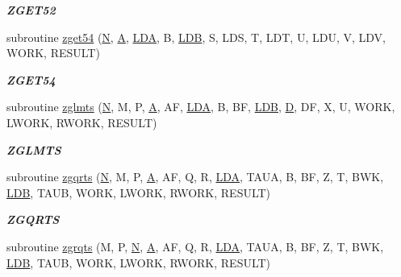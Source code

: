 \begin{DoxyCompactItemize}
\begin{DoxyCompactList}\small\item\em {\bfseries Z\+G\+E\+T52} \end{DoxyCompactList}\item 
subroutine \hyperlink{group__complex16__eig_ga8cfa5d9479fe4546ef7d28e400003358}{zget54} (\hyperlink{polmisc_8c_a0240ac851181b84ac374872dc5434ee4}{N}, \hyperlink{classA}{A}, \hyperlink{example__user_8c_ae946da542ce0db94dced19b2ecefd1aa}{L\+D\+A}, B, \hyperlink{example__user_8c_a50e90a7104df172b5a89a06c47fcca04}{L\+D\+B}, S, L\+D\+S, T, L\+D\+T, U, L\+D\+U, V, L\+D\+V, W\+O\+R\+K, R\+E\+S\+U\+L\+T)
\begin{DoxyCompactList}\small\item\em {\bfseries Z\+G\+E\+T54} \end{DoxyCompactList}\item 
subroutine \hyperlink{group__complex16__eig_gab64718de54eca7f9e28308a0cdce411f}{zglmts} (\hyperlink{polmisc_8c_a0240ac851181b84ac374872dc5434ee4}{N}, M, P, \hyperlink{classA}{A}, A\+F, \hyperlink{example__user_8c_ae946da542ce0db94dced19b2ecefd1aa}{L\+D\+A}, B, B\+F, \hyperlink{example__user_8c_a50e90a7104df172b5a89a06c47fcca04}{L\+D\+B}, \hyperlink{odrpack_8h_a7dae6ea403d00f3687f24a874e67d139}{D}, D\+F, X, U, W\+O\+R\+K, L\+W\+O\+R\+K, R\+W\+O\+R\+K, R\+E\+S\+U\+L\+T)
\begin{DoxyCompactList}\small\item\em {\bfseries Z\+G\+L\+M\+T\+S} \end{DoxyCompactList}\item 
subroutine \hyperlink{group__complex16__eig_ga66843d0b4fb7bdf9641534ed86711b55}{zgqrts} (\hyperlink{polmisc_8c_a0240ac851181b84ac374872dc5434ee4}{N}, M, P, \hyperlink{classA}{A}, A\+F, Q, R, \hyperlink{example__user_8c_ae946da542ce0db94dced19b2ecefd1aa}{L\+D\+A}, T\+A\+U\+A, B, B\+F, Z, T, B\+W\+K, \hyperlink{example__user_8c_a50e90a7104df172b5a89a06c47fcca04}{L\+D\+B}, T\+A\+U\+B, W\+O\+R\+K, L\+W\+O\+R\+K, R\+W\+O\+R\+K, R\+E\+S\+U\+L\+T)
\begin{DoxyCompactList}\small\item\em {\bfseries Z\+G\+Q\+R\+T\+S} \end{DoxyCompactList}\item 
subroutine \hyperlink{group__complex16__eig_ga52fe5c26c3ab6431adb83d9bba8b4eeb}{zgrqts} (M, P, \hyperlink{polmisc_8c_a0240ac851181b84ac374872dc5434ee4}{N}, \hyperlink{classA}{A}, A\+F, Q, R, \hyperlink{example__user_8c_ae946da542ce0db94dced19b2ecefd1aa}{L\+D\+A}, T\+A\+U\+A, B, B\+F, Z, T, B\+W\+K, \hyperlink{example__user_8c_a50e90a7104df172b5a89a06c47fcca04}{L\+D\+B}, T\+A\+U\+B, W\+O\+R\+K, L\+W\+O\+R\+K, R\+W\+O\+R\+K, R\+E\+S\+U\+L\+T)

\end{DoxyCompactItemize}
